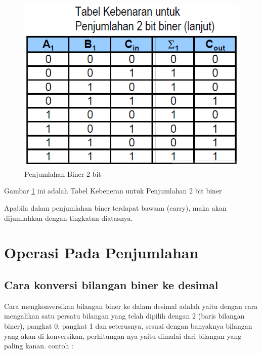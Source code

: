 	\begin{figure} [ht]
	\centerline{\includegraphics[width=1\textwidth]{figures/Biner2angka.png}}
	\caption{Penjumlahan Biner 2 bit}
	\label{Biner2angka}
	\end{figure}
Gambar \ref{Biner2angka} ini adalah Tabel Kebeneran untuk Penjumlahan 2 bit biner

Apabila dalam penjumlahan biner terdapat bawaan (carry), maka akan dijumlahkan dengan tingkatan diatasnya.

\section {Operasi Pada Penjumlahan}
\subsection {Cara konversi bilangan biner ke desimal}
Cara mengkonversikan bilangan biner ke dalam desimal adalah yaitu dengan cara mengalikan satu persatu bilangan yang telah dipilih dengan 2 (baris bilangan biner), pangkat 0, pangkat 1 dan seterusnya, sesuai dengan banyaknya bilangan yang akan di konversikan, perhitungan nya yaitu dimulai dari bilangan yang paling kanan. 
contoh :


\cite{wang201140}
\cite{brent1970addition}
\cite{detmer2001introduction}
\cite{nurhayati2010aritmatik}
\cite{dosen2013matematika}
\cite{hutahaean2015konsep}